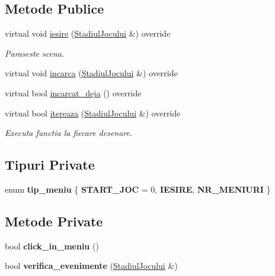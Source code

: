 \subsection*{Metode Publice}
\begin{DoxyCompactItemize}
\item 
\mbox{\label{classMeniuStart_abfc0ef10adadd6f9756996fc7c61bf76}} 
virtual void \hyperlink{classMeniuStart_abfc0ef10adadd6f9756996fc7c61bf76}{iesire} (\hyperlink{classStadiulJocului}{Stadiul\+Jocului} \&) override
\begin{DoxyCompactList}\small\item\em Paraseste scena. \end{DoxyCompactList}\item 
virtual void \hyperlink{classMeniuStart_afb59dcb21968a6ccd685a6c9c0d6a0c1}{incarca} (\hyperlink{classStadiulJocului}{Stadiul\+Jocului} \&) override
\item 
virtual bool \hyperlink{classMeniuStart_a76d8d1b449800060994971ea9df75fd3}{incarcat\+\_\+deja} () override
\item 
virtual bool \hyperlink{classMeniuStart_a35a84c537eca90b76697d1bef88216e5}{itereaza} (\hyperlink{classStadiulJocului}{Stadiul\+Jocului} \&) override
\begin{DoxyCompactList}\small\item\em Executa functia la fiecare \textquotesingle{}desenare\textquotesingle{}. \end{DoxyCompactList}\end{DoxyCompactItemize}
\subsection*{Tipuri Private}
\begin{DoxyCompactItemize}
\item 
\mbox{\label{classMeniuStart_a9c31d6c8b52efb87116aac4b176f8375}} 
enum {\bfseries tip\+\_\+meniu} \{ {\bfseries S\+T\+A\+R\+T\+\_\+\+J\+OC} = 0, 
{\bfseries I\+E\+S\+I\+RE}, 
{\bfseries N\+R\+\_\+\+M\+E\+N\+I\+U\+RI}
 \}
\end{DoxyCompactItemize}
\subsection*{Metode Private}
\begin{DoxyCompactItemize}
\item 
\mbox{\label{classMeniuStart_ae81aee43c415d5ea2f07469baa2fcfc1}} 
bool {\bfseries click\+\_\+in\+\_\+meniu} ()
\item 
\mbox{\label{classMeniuStart_a046f60fb2d3a67db5cef26376c69150e}} 
bool {\bfseries verifica\+\_\+evenimente} (\hyperlink{classStadiulJocului}{Stadiul\+Jocului} \&)
\end{DoxyCompactItemize}

